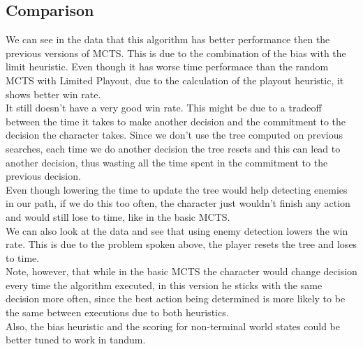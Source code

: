 \documentclass{article}
\begin{document}
  \subsection{Comparison}
  We can see in the data that this algorithm has better performance then the previous versions of MCTS. This is due to the combination of the bias with the limit heuristic.
  Even though it has worse time performace than the random MCTS with Limited Playout, due to the calculation of the playout heuristic, it shows better win rate. \\
  It still doesn't have a very good win rate. This might be due to a tradeoff between the time it takes to make another decision and the commitment to the decision the
  character takes. Since we don't use the tree computed on previous searches, each time we do another decision the tree resets and this can lead to another decision,
  thus wasting all the time spent in the commitment to the previous decision.\\ 
  Even though lowering the time to update the tree would help detecting enemies in our path, if we do this too often, the character just wouldn't finish any action 
  and would still lose to time, like in the basic MCTS.\\
  We can also look at the data and see that using enemy detection lowers the win rate. This is due to the problem spoken above, the player resets the tree and loses
  to time.\\
  Note, however, that while in the basic MCTS the character would change decision every time the algorithm executed,
in this version he sticks with the same decision more often, since the best action being determined is more likely to be the same between executions due to
both heuristics.\\
  Also, the bias heuristic and the scoring for non-terminal world states could be better tuned to work in tandum. \\
\end{document}

